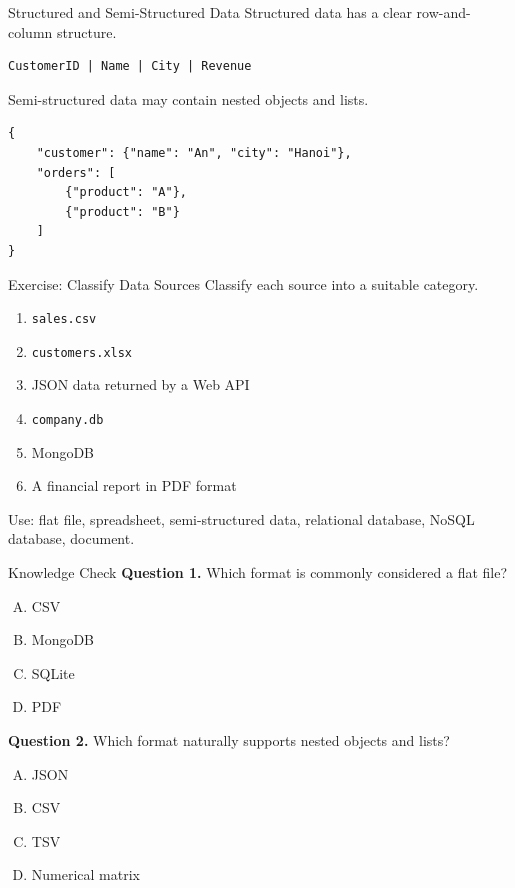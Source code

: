 \documentclass[aspectratio=169,11pt]{beamer}
\newcommand{\code}[1]{\texttt{#1}}
\newcommand{\smallgap}{\vspace{0.4em}}
\begin{document}
\begin{frame}[fragile]{Structured and Semi-Structured Data}
Structured data has a clear row-and-column structure.
\begin{lstlisting}[style=textstyle]
CustomerID | Name | City | Revenue
\end{lstlisting}

Semi-structured data may contain nested objects and lists.
\begin{lstlisting}[style=pythonstyle]
{
    "customer": {"name": "An", "city": "Hanoi"},
    "orders": [
        {"product": "A"},
        {"product": "B"}
    ]
}
\end{lstlisting}
\end{frame}

\begin{frame}{Exercise: Classify Data Sources}
Classify each source into a suitable category.
\begin{enumerate}
  \item \code{sales.csv}
  \item \code{customers.xlsx}
  \item JSON data returned by a Web API
  \item \code{company.db}
  \item MongoDB
  \item A financial report in PDF format
\end{enumerate}

\smallgap
Use: flat file, spreadsheet, semi-structured data, relational database, NoSQL database, document.
\end{frame}

\begin{frame}{Knowledge Check}
\textbf{Question 1.} Which format is commonly considered a flat file?
\begin{enumerate}[A.]
  \item CSV
  \item MongoDB
  \item SQLite
  \item PDF
\end{enumerate}

\smallgap
\textbf{Question 2.} Which format naturally supports nested objects and lists?
\begin{enumerate}[A.]
  \item JSON
  \item CSV
  \item TSV
  \item Numerical matrix
\end{enumerate}
\end{frame}
\end{document}
